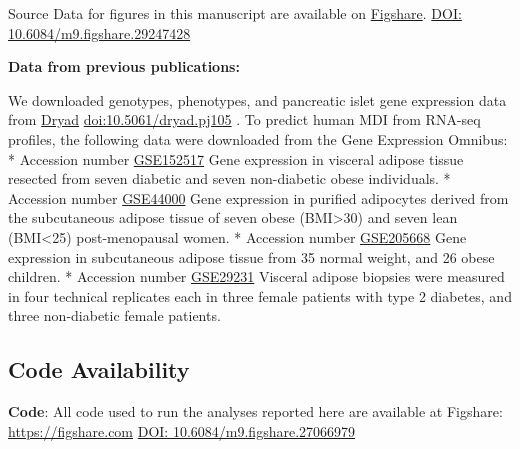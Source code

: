 \documentclass[
]{article}
\begin{document}
Source Data for figures in this manuscript are available on
\href{https://figshare.com/}{Figshare}.
\href{https://figshare.com/account/projects/251795/articles/29247428?file=55154321}{DOI:
10.6084/m9.figshare.29247428} \cite{source_data}

\textbf{Data from previous publications:}

We downloaded genotypes, phenotypes, and pancreatic islet gene
expression data from \href{https://datadryad.org/}{Dryad}
\href{https://datadryad.org/dataset/doi:10.5061/dryad.pj105}{doi:10.5061/dryad.pj105}
\cite{DO_data}. To predict human MDI from RNA-seq profiles, the
following data were downloaded from the Gene Expression Omnibus: *
Accession number
\href{https://www.ncbi.nlm.nih.gov/geo/query/acc.cgi?acc=GSE152517}{GSE152517}
Gene expression in visceral adipose tissue resected from seven diabetic
and seven non-diabetic obese individuals. * Accession number
\href{https://www.ncbi.nlm.nih.gov/geo/query/acc.cgi?acc=GSE44000}{GSE44000}
Gene expression in purified adipocytes derived from the subcutaneous
adipose tissue of seven obese (BMI\textgreater30) and seven lean
(BMI\textless25) post-menopausal women. * Accession number
\href{https://www.ncbi.nlm.nih.gov/geo/query/acc.cgi?acc=GSE205668}{GSE205668}
Gene expression in subcutaneous adipose tissue from 35 normal weight,
and 26 obese children. * Accession number
\href{https://www.ncbi.nlm.nih.gov/geo/query/acc.cgi?acc=GSE29231}{GSE29231}
Visceral adipose biopsies were measured in four technical replicates
each in three female patients with type 2 diabetes, and three
non-diabetic female patients.

\subsection{Code Availability}\label{code-availability}

\textbf{Code}: All code used to run the analyses reported here are
available at Figshare: \url{https://figshare.com}
\href{https://figshare.com/articles/dataset/Data_and_code_for_High-Dimensional_Mediation_Analysis_HDMA_in_diversity_outbred_mice/27066979}{DOI:
10.6084/m9.figshare.27066979} \cite{cube_data}

\pagebreak
\end{document}
